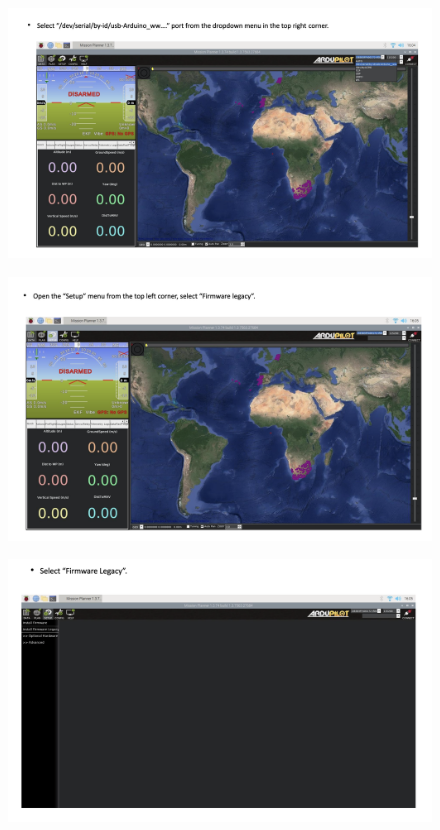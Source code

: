 \begin{figure}[h!]
\centering
\includegraphics[width=\columnwidth]{./Figures/config_img19.png}
\end{figure}

\begin{figure}[h!]
\centering
\includegraphics[width=\columnwidth]{./Figures/config_img20.png}
\end{figure}

\begin{figure}[h!]
\centering
\includegraphics[width=\columnwidth]{./Figures/config_img21.png}
\end{figure}

